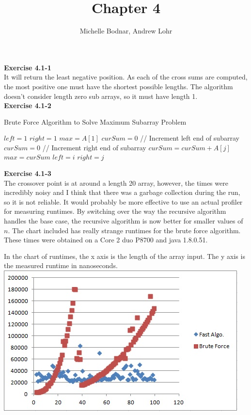 \documentclass{article}
\title{Chapter 4}
\author{Michelle Bodnar, Andrew Lohr}
\begin{document}
\maketitle

\noindent\textbf{Exercise 4.1-1}\\

It will return the least negative position. As each of the cross sums are computed, the most positive one must have the shortest possible lengths. The algorithm doesn't consider length zero sub arrays, so it must have length 1.\\

\noindent\textbf{Exercise 4.1-2}\\

\begin{algorithm}
\caption{Brute Force Algorithm to Solve Maximum Subarray Problem}
\begin{algorithmic}
\State $left = 1$
\State $right = 1$
\State $max = A[1]$
\State $curSum = 0$
 // Increment left end of subarray
	\State $curSum = 0$
	 // Increment right end of subarray
		\State $curSum = curSum + A[j]$
			\State $max = curSum$
			\State $left = i$
			\State $right = j$
		\EndIf
	\EndFor
\EndFor
\end{algorithmic}
\end{algorithm}

\noindent\textbf{Exercise 4.1-3}\\

The crossover point is at around a length 20 array, however, the times were incredibly noisy and I think that there was a garbage collection during the run, so it is not reliable. It would probably be more effective to use an actual profiler for measuring runtimes. By switching over the way the recursive algorithm handles the base case, the recursive algorithm is now better for smaller values of $n$. The chart included has really strange runtimes for the brute force algorithm. These times were obtained on a Core 2 duo P8700 and java 1.8.0.51.

In the chart of runtimes, the x axis is the length of the array input. The y axis is the measured runtime in nanoseconds.\\

\includegraphics{4(1)}
\end{document}
